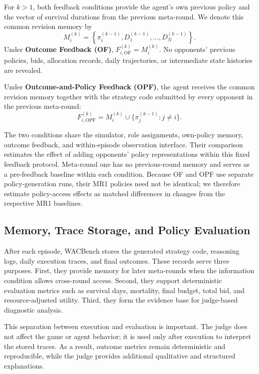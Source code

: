 \documentclass[letterpaper]{article} %
\begin{document}
For $k>1$, both feedback conditions provide the agent's own
previous policy and the vector of survival durations from the
previous meta-round. We denote this common revision memory by
\begin{equation}
    M_i^{(k)}
    =
    \left\{\pi_i^{(k-1)},
    D_1^{(k-1)},\ldots,D_N^{(k-1)}\right\}.
\end{equation}
Under \textbf{Outcome Feedback (OF)}, $F_{i,\mathrm{OF}}^{(k)}=M_i^{(k)}$.
No opponents' previous policies, bids, allocation records, daily
trajectories, or intermediate state histories are revealed.

Under \textbf{Outcome-and-Policy Feedback (OPF)}, the agent
receives the common revision memory together with the strategy
code submitted by every opponent in the previous meta-round:
\begin{equation}
    F_{i,\mathrm{OPF}}^{(k)}
    =
    M_i^{(k)}
    \cup
    \{\pi_j^{(k-1)}:j\neq i\}.
\end{equation}

The two conditions share the simulator, role assignments, own-policy memory,
outcome feedback, and within-episode observation interface. Their comparison
estimates the effect of adding opponents' policy representations within this
fixed feedback protocol. Meta-round one has no previous-round memory and
serves as a pre-feedback baseline within each condition. Because OF and OPF
use separate policy-generation runs, their MR1 policies need not be identical;
we therefore estimate policy-access effects as matched differences in changes
from the respective MR1 baselines.

\subsection{Memory, Trace Storage, and Policy Evaluation}

After each episode, WACBench stores the generated strategy code, reasoning logs, daily execution traces, and final outcomes. These records serve three purposes. First, they provide memory for later meta-rounds when the information condition allows cross-round access. Second, they support deterministic evaluation metrics such as survival days, mortality, final budget, total bid, and resource-adjusted utility. Third, they form the evidence base for judge-based diagnostic analysis.

This separation between execution and evaluation is important. The judge does not affect the game or agent behavior; it is used only after execution to interpret the stored traces. As a result, outcome metrics remain deterministic and reproducible, while the judge provides additional qualitative and structured explanations.
\end{document}
